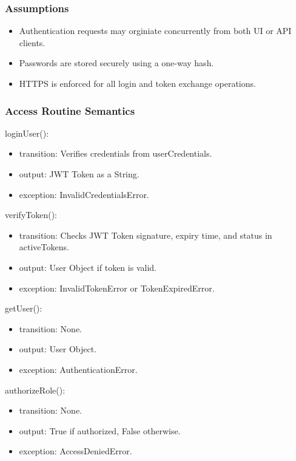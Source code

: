\documentclass[12pt, titlepage]{article}
\begin{document}
\subsubsection{Assumptions}

\begin{itemize}
  \item{Authentication requests may orginiate concurrently from both UI or API clients.}
  \item{Passwords are stored securely using a one-way hash.}
  \item{HTTPS is enforced for all login and token exchange operations.}
\end{itemize}

\subsubsection{Access Routine Semantics}

\noindent loginUser():
\begin{itemize}
\item transition: Verifies credentials from userCredentials.
\item output: JWT Token as a String.
\item exception: InvalidCredentialsError.
\end{itemize}

\noindent verifyToken():
\begin{itemize}
\item transition: Checks JWT Token signature, expiry time, and status in activeTokens.
\item output: User Object if token is valid.
\item exception: InvalidTokenError or TokenExpiredError.
\end{itemize}

\noindent getUser():
\begin{itemize}
\item transition: None.
\item output: User Object.
\item exception: AuthenticationError.
\end{itemize}

\noindent authorizeRole():
\begin{itemize}
\item transition: None.
\item output: True if authorized, False otherwise.
\item exception: AccessDeniedError.
\end{itemize}
\end{document}
